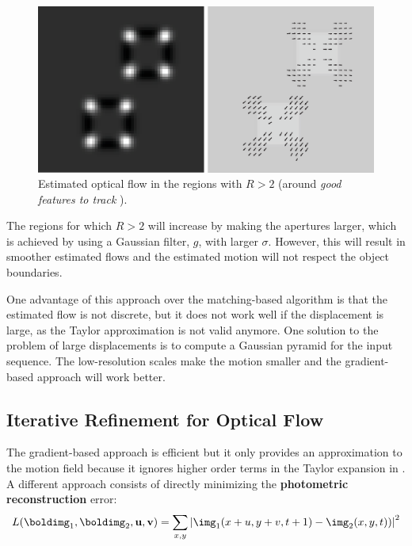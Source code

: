 \begin{figure}[h!]
\centerline{
\includegraphics[width=.7\linewidth]{figures/optical_flow/square_grandient_based_4.eps}
}
\caption{Estimated optical flow in the regions with $R > 2$ (around {\em good features to track} \cite{shi1994goodfeatures}).}
\label{fig:square_grandient_based_4}
\end{figure}

The regions for which $R > 2$ will increase by making the apertures larger, which is achieved by using a Gaussian filter, $g$, with larger $\sigma$. However, this will result in smoother estimated flows and the estimated motion will not respect the object boundaries.  

One advantage of this approach over the matching-based algorithm is that the estimated flow is not discrete, but it does not work well if the displacement is large, as the Taylor approximation is not valid anymore. One solution to the problem of large displacements is to compute a Gaussian pyramid for the input sequence. The low-resolution scales make the motion smaller and the gradient-based approach will work better. 

\subsection{Iterative Refinement for Optical Flow}

The gradient-based approach is efficient but it only provides an approximation to the motion field because it ignores higher order terms in the Taylor expansion in \eqn{\ref{eq:motion_taylor}}. A different approach consists of directly minimizing the {\bf photometric reconstruction} error: 
\begin{equation}
L(\boldimg_1,\boldimg_2,\mathbf{u}, \mathbf{v})= 
\sum_{x,y} \left| \img_1 (x+u,y+v,t+1) - \img_2 (x,y,t)) \right| ^2 
\end{equation}

